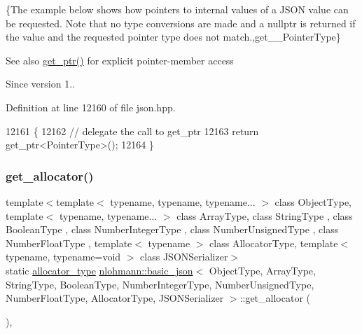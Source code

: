 \{The example below shows how pointers to internal values of a J\+S\+ON value can be requested. Note that no type conversions are made and a {\ttfamily nullptr} is returned if the value and the requested pointer type does not match.,get\+\_\+\+\_\+\+Pointer\+Type\}

\begin{DoxySeeAlso}{See also}
\hyperlink{classnlohmann_1_1basic__json_aefa46bd2d96bb77a38d1c8b431eab44f}{get\+\_\+ptr()} for explicit pointer-\/member access
\end{DoxySeeAlso}
\begin{DoxySince}{Since}
version 1.. 
\end{DoxySince}


Definition at line 12160 of file json.\+hpp.


\begin{DoxyCode}
12161     \{
12162         \textcolor{comment}{// delegate the call to get\_ptr}
12163         \textcolor{keywordflow}{return} get\_ptr<PointerType>();
12164     \}
\end{DoxyCode}
\mbox{\label{classnlohmann_1_1basic__json_af4ac14224fbdd29d3547fcb11bb55c8f}} 
\subsubsection{\texorpdfstring{get\+\_\+allocator()}{get\_allocator()}}
{\footnotesize\ttfamily template$<$template$<$ typename, typename, typename... $>$ class Object\+Type, template$<$ typename, typename... $>$ class Array\+Type, class String\+Type , class Boolean\+Type , class Number\+Integer\+Type , class Number\+Unsigned\+Type , class Number\+Float\+Type , template$<$ typename $>$ class Allocator\+Type, template$<$ typename, typename=void $>$ class J\+S\+O\+N\+Serializer$>$ \\
static \hyperlink{classnlohmann_1_1basic__json_a86ce930490cf7773b26f5ef49c04a350}{allocator\+\_\+type} \hyperlink{classnlohmann_1_1basic__json}{nlohmann\+::basic\+\_\+json}$<$ Object\+Type, Array\+Type, String\+Type, Boolean\+Type, Number\+Integer\+Type, Number\+Unsigned\+Type, Number\+Float\+Type, Allocator\+Type, J\+S\+O\+N\+Serializer $>$\+::get\+\_\+allocator (\begin{DoxyParamCaption}{ }\end{DoxyParamCaption})\hspace{0.3cm}{\ttfamily [inline]}, {\ttfamily [static]}}



